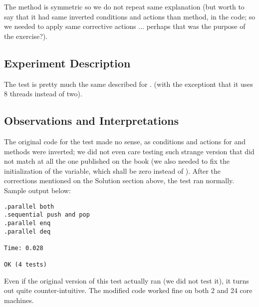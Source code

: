 The  method is symmetric so we do not repeat same explanation
(but worth to say that it had same inverted conditions and actions
than  method, in the code; so we needed to apply same
corrective actions ... perhaps that was the purpose of the exercise?).

\subsection{Experiment Description}
The test is pretty much the same described for .
(with the exceptiont that it uses 8 threads instead of two).

\subsection{Observations and Interpretations}
The original code for the test made no sense, as conditions and
actions for  and  methods were inverted; we did not even
care testing such strange version that did not match at all the one
published on the book (we also needed to fix the initialization of the
 variable, which shall be zero instead of ). After
the corrections mentioned on the Solution section above, the test ran
normally. Sample output below: 

\begin{verbatim}
.parallel both
.sequential push and pop
.parallel enq
.parallel deq

Time: 0.028

OK (4 tests)
\end{verbatim}
\hfill

Even if the original version of this test actually ran (we did not
test it), it turns out quite counter-intuitive. The modified code worked fine
on both 2 and 24 core machines.


